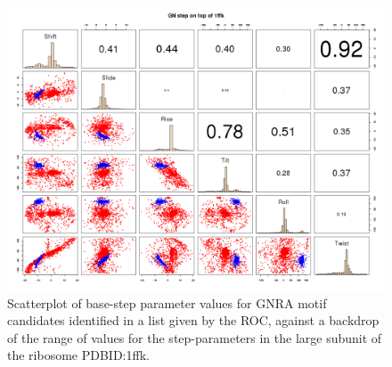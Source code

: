 \begin{figure}
\centering 
\includegraphics[angle=0, scale=0.5]{Chapter5/GNRAin1ffk.png}
\caption{Scatterplot  of  base-step parameter  values  for GNRA  motif
  candidates identified in a list given by the ROC, against a backdrop
  of the range of values  for the step-parameters in the large subunit
  of the ribosome PDBID:1ffk.}
\label{fig:scattergnra}
\end{figure}



